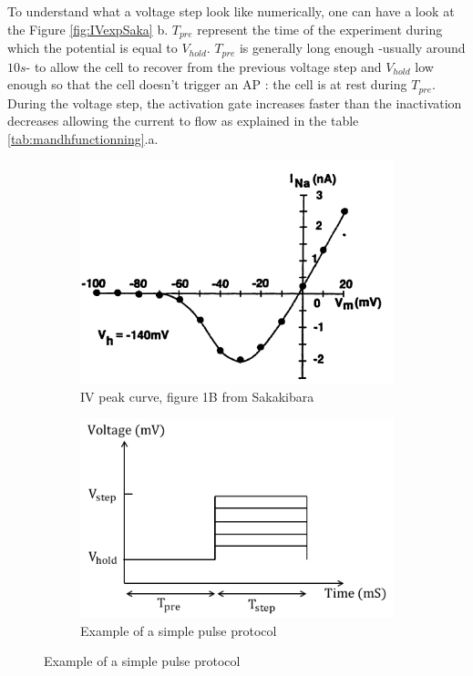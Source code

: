 \documentclass[11pt]{report}
\begin{document}
To understand what a voltage step look like numerically, one can have a look at the Figure \ref{fig:IVexpSaka} b. $T_{pre}$ represent the time of the experiment during which the potential is equal to $V_{hold}$. $T_{pre}$ is generally long enough -usually around $10s$- to allow the cell to recover from the previous voltage step and $V_{hold}$ low enough so that the cell doesn't trigger an AP : the cell is at rest during $T_{pre}$. During the voltage step, the activation gate increases faster than the inactivation decreases allowing the current to flow as explained in the table \ref{tab:mandhfunctionning}.a.


\begin{figure}[H]
    \centering
    \captionsetup{singlelinecheck = false, format= hang, justification=centerlast, font=footnotesize, labelsep=space}
    \begin{subfigure}[b]{0.49\textwidth}
    \centering
        \includegraphics[width=\linewidth]{figures/IVCurveSaka.png}
        \caption{IV peak curve, figure 1B from Sakakibara \cite{Sakakibara1992}}
    \end{subfigure}
    \begin{subfigure}[b]{0.49\textwidth}
    \centering
        \includegraphics[width=\linewidth]{figures/SimplePulseProtocol.png}
        \caption{Example of a simple pulse protocol}
    \end{subfigure}


\end{figure}
\end{document}
